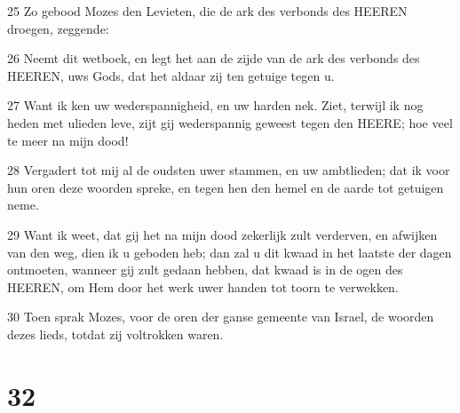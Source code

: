 \par 25 Zo gebood Mozes den Levieten, die de ark des verbonds des HEEREN droegen, zeggende:
\par 26 Neemt dit wetboek, en legt het aan de zijde van de ark des verbonds des HEEREN, uws Gods, dat het aldaar zij ten getuige tegen u.
\par 27 Want ik ken uw wederspannigheid, en uw harden nek. Ziet, terwijl ik nog heden met ulieden leve, zijt gij wederspannig geweest tegen den HEERE; hoe veel te meer na mijn dood!
\par 28 Vergadert tot mij al de oudsten uwer stammen, en uw ambtlieden; dat ik voor hun oren deze woorden spreke, en tegen hen den hemel en de aarde tot getuigen neme.
\par 29 Want ik weet, dat gij het na mijn dood zekerlijk zult verderven, en afwijken van den weg, dien ik u geboden heb; dan zal u dit kwaad in het laatste der dagen ontmoeten, wanneer gij zult gedaan hebben, dat kwaad is in de ogen des HEEREN, om Hem door het werk uwer handen tot toorn te verwekken.
\par 30 Toen sprak Mozes, voor de oren der ganse gemeente van Israel, de woorden dezes lieds, totdat zij voltrokken waren.

\chapter{32}

